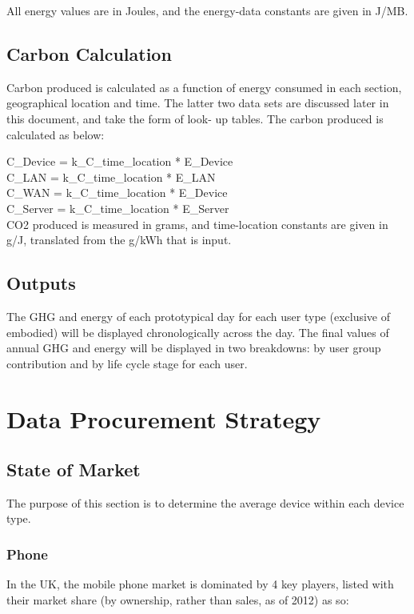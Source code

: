 \documentclass[conference]{IEEEtran}
\begin{document}
All energy values are in Joules, and the energy-data constants are given in J/MB.

\subsection{Carbon Calculation}

Carbon produced is calculated as a function of energy consumed in each
section, geographical location and time. The latter two data sets are
discussed later in this document, and take the form of look- up
tables. The carbon produced is calculated as below:

C\_Device = k\_C\_time\_location * E\_Device\\
C\_LAN = k\_C\_time\_location * E\_LAN\\
C\_WAN = k\_C\_time\_location * E\_Device\\
C\_Server = k\_C\_time\_location * E\_Server\\

CO2 produced is measured in grams, and time-location constants are
given in g/J, translated from the g/kWh that is input.

\subsection{Outputs}

The GHG and energy of each prototypical day for each user type
(exclusive of embodied) will be displayed chronologically across the
day. The final values of annual GHG and energy will be displayed in two
breakdowns: by user group contribution and by life cycle stage for
each user.


\section{Data Procurement Strategy}

\subsection{State of Market}

The purpose of this section is to determine the average device within
each device type.

\subsubsection{Phone}

In the UK, the mobile phone market is dominated by 4 key players,
listed with their market share (by ownership, rather than sales, as of
2012) as so:
\end{document}
